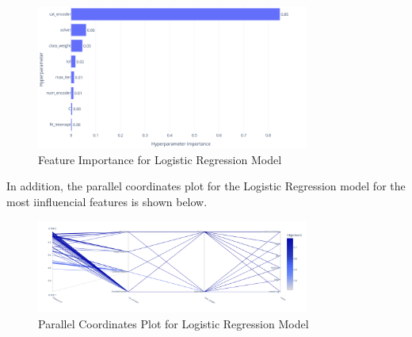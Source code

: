 \documentclass{article}
\begin{document}
\begin{figure}[H]
  \centering
  \includegraphics[width=0.8\textwidth]{img/lr_importance.png}
  \caption{Feature Importance for Logistic Regression Model}
\end{figure}

\noindent In addition, the parallel coordinates plot for the Logistic Regression model for the most iinfluencial features is shown below.

\begin{figure}[H]
  \centering
  \includegraphics[width=0.8\textwidth]{img/tmp2.png}
  \caption{Parallel Coordinates Plot for Logistic Regression Model}
\end{figure}


\printbibliography
\end{document}
